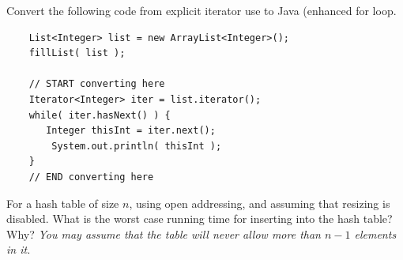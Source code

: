 \documentclass[11pt]{exam}
\begin{document}
\begin{questions}
\begin{parts}
	\part[2] \makebox[4in]{\hrulefill}
	\part[2] \makebox[4in]{\hrulefill}
	\part[2] \makebox[4in]{\hrulefill}
	\part[2] \makebox[4in]{\hrulefill}
	\part[2] \makebox[4in]{\hrulefill}
	\part[2] \makebox[4in]{\hrulefill}
\end{parts}


\question[5] Convert the following code from explicit iterator use to Java (enhanced for loop.
\begin{lstlisting}
	List<Integer> list = new ArrayList<Integer>();
	fillList( list );
	
	// START converting here
	Iterator<Integer> iter = list.iterator();
	while( iter.hasNext() ) {
	   Integer thisInt = iter.next();
		System.out.println( thisInt );
	}
	// END converting here
\end{lstlisting}
\vspace{3in}
\newpage
\question[5] For a hash table of size $n$, using open addressing, and assuming that resizing is disabled.   What is the worst case running time for inserting into the hash table?  Why? {\it You may assume that the table will never allow more than $n-1$ elements in it.}
\vspace{3.0in}


\end{questions}
\end{document}
